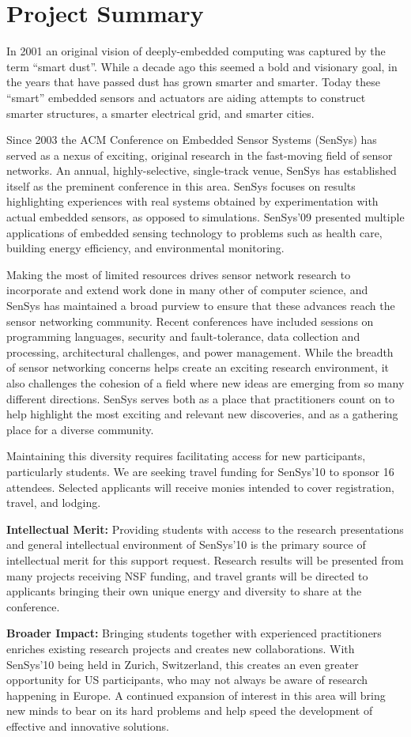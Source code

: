 \documentclass[11pt,letterpaper]{article}
\begin{document}
\section*{Project Summary}

In 2001 an original vision of deeply-embedded computing was captured by the
term ``smart dust''. While a decade ago this seemed a bold and visionary goal,
in the years that have passed dust has grown smarter and smarter. Today these
``smart'' embedded sensors and actuators are aiding attempts to construct
smarter structures, a smarter electrical grid, and smarter cities.

Since 2003 the ACM Conference on Embedded Sensor Systems (SenSys) has served
as a nexus of exciting, original research in the fast-moving field of sensor
networks. An annual, highly-selective, single-track venue, SenSys has
established itself as the preminent conference in this area.
SenSys focuses on results highlighting experiences with real systems obtained
by experimentation with actual embedded sensors, as opposed to simulations.
SenSys'09 presented multiple applications of embedded sensing technology to
problems such as health care, building energy efficiency, and environmental
monitoring.

Making the most of limited resources drives sensor network research to
incorporate and extend work done in many other of computer science, and
SenSys has maintained a broad purview to ensure that these advances reach the
sensor networking community. Recent conferences have included sessions on
programming languages, security and fault-tolerance, data collection and
processing, architectural challenges, and power management. While the breadth
of sensor networking concerns helps create an exciting research environment,
it also challenges the cohesion of a field where new ideas are emerging from
so many different directions. SenSys serves both as a place that
practitioners count on to help highlight the most exciting and relevant new
discoveries, and as a gathering place for a diverse community.

Maintaining this diversity requires facilitating access for new participants,
particularly students. We are seeking travel funding for SenSys'10 to sponsor
16 attendees. Selected applicants will receive monies intended to cover
registration, travel, and lodging.

\textbf{Intellectual Merit:} Providing students with access to the research
presentations and general intellectual environment of SenSys'10 is the
primary source of intellectual merit for this support request. Research
results will be presented from many projects receiving NSF funding, and
travel grants will be directed to applicants bringing their own unique energy
and diversity to share at the conference.

\textbf{Broader Impact:} Bringing students together with experienced
practitioners enriches existing research projects and creates new
collaborations. With SenSys'10 being held in Zurich, Switzerland, this
creates an even greater opportunity for US participants, who may not always
be aware of research happening in Europe. A continued expansion of interest
in this area will bring new minds to bear on its hard problems and help speed
the development of effective and innovative solutions.
\end{document}

